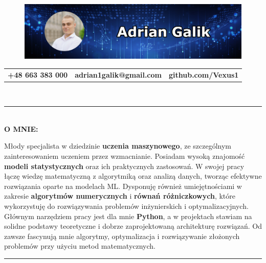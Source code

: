 \documentclass[10pt]{article}
\begin{document}
\begin{figure}[t]
    \hskip-1.55cm\includegraphics[scale=1.3625]{Galik_BANNER.png}
\end{figure}

\vspace*{-4ex}

\noindent
\begin{tabularx}{\textwidth}{l C{12cm} r}
    \textbf{+48 663 383 000} &
    \textbf{adrian1galik@gmail.com} &
    \textbf{github.com/Vexus1}
\end{tabularx} \\
\rule{\textwidth}{1pt} \\

\noindent \fontsize{14pt}{14pt}\selectfont \textbf{\color{Violet}O MNIE:}
\fontsize{10pt}{10pt}\selectfont

\noindent Młody specjalista w dziedzinie \textbf{uczenia maszynowego}, ze szczególnym zainteresowaniem uczeniem przez wzmacnianie.
Posiadam wysoką znajomość \textbf{modeli statystycznych} oraz ich praktycznych zastosowań.
W swojej pracy łączę wiedzę matematyczną z algorytmiką oraz analizą danych, tworząc efektywne rozwiązania oparte na modelach ML. 
Dysponuję również umiejętnościami w zakresie \textbf{algorytmów numerycznych} i \textbf{równań różniczkowych}, które wykorzystuję do rozwiązywania problemów inżynierskich i optymalizacyjnych. 
Głównym narzędziem pracy jest dla mnie \textbf{Python}, a w projektach stawiam na solidne podstawy teoretyczne i dobrze zaprojektowaną architekturę rozwiązań.
Od zawsze fascynują mnie algorytmy, optymalizacja i rozwiązywanie złożonych problemów przy użyciu metod matematycznych.

\noindent \rule{\textwidth}{1pt} \\
\end{document}
